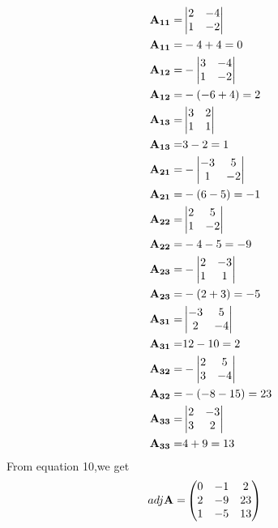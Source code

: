 \documentclass[two column]{article}
\begin{document}
\begin{enumerate}
\begin{align}
                  \end{align}
                  \begin{align}
                      \mathbf{A_{11}}=&\begin{vmatrix}2 & -4 \\ 1 & -2\end{vmatrix}\\
                      \mathbf{A_{11}}=&-4+4=0\\
                      \mathbf{A_{12}}=&-\begin{vmatrix}3 & -4\\ 1 & -2\end{vmatrix}\\
                      \mathbf{A_{12}}=&-(-6+4)=2\\
                      \mathbf{A_{13}}=&\begin{vmatrix} 3 & 2 \\1&1\end{vmatrix}\\
                      \mathbf{A_{13}}=&3-2=1\\
                      \mathbf{A_{21}}=&-\begin{vmatrix}-3 & 5 \\ 1 & -2\end{vmatrix}\\
                      \mathbf{A_{21}}=&-(6-5)=-1\\
                      \mathbf{A_{22}}=&\begin{vmatrix}2 & 5 \\1 & -2\end{vmatrix}\\
                      \mathbf{A_{22}}=&-4-5=-9\\
                      \mathbf{A_{23}}=&-\begin{vmatrix}2 & -3 \\ 1 & 1\end{vmatrix}\\
                      \mathbf{A_{23}}=&-(2+3)=-5\\
                      \mathbf{ A_{31}}=&\begin{vmatrix}-3 & 5\\2 & -4\end{vmatrix}\\
                      \mathbf{A_{31}}=&12-10=2\\
                      \mathbf{A_{32}}=&-\begin{vmatrix}2 & 5 \\ 3  &-4 \end{vmatrix}\\
                      \mathbf{A_{32}}=&-(-8-15)=23\\
                      \mathbf{A_{33}}=&\begin{vmatrix}2 & -3 \\ 3 & 2\end{vmatrix}\\
                      \mathbf{A_{33}}=&4+9=13\\
                  \end{align}
                    From equation 10,we get
                    \begin{align}
                    adj\mathbf{A}=&\begin{pmatrix}0 & -1 & 2\\ 2 & -9 & 23 \\ 1 & -5 & 13\end{pmatrix}
                    \end{align}

\end{enumerate}
\end{document}
